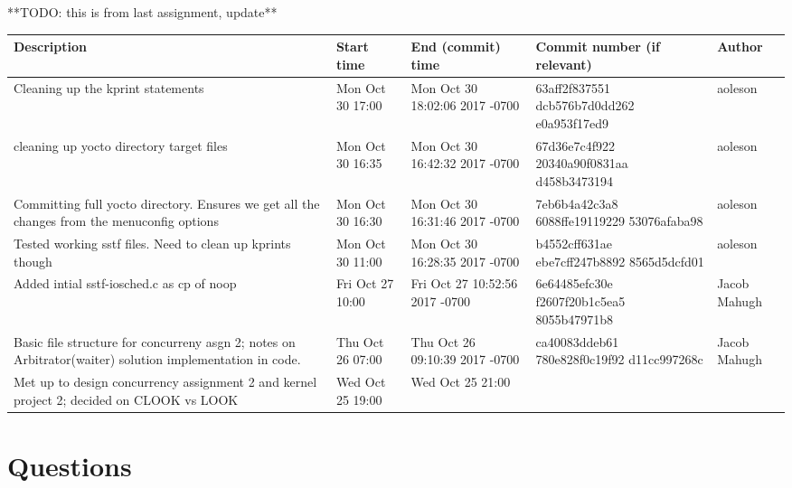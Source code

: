 \documentclass[letterpaper,10pt,titlepage]{article}
\begin{document}
**TODO: this is from last assignment, update**


\begin{table}[H]
\centering
\begin{tabular}{|p{3cm}|p{2cm}|p{2cm}|p{3cm}|p{2cm}|}
\hline
Description                                                                                              & Start time       & End (commit) time              & Commit number (if relevant)              & Author       \\
\hline
Cleaning up the kprint statements                                                                        & Mon Oct 30 17:00 & Mon Oct 30 18:02:06 2017 -0700 & 63aff2f837551 dcb576b7d0dd262 e0a953f17ed9 & aoleson      \\
\hline
cleaning up yocto directory target files                                                                 & Mon Oct 30 16:35 & Mon Oct 30 16:42:32 2017 -0700 & 67d36e7c4f922 20340a90f0831aa d458b3473194 & aoleson      \\
\hline
Committing full yocto directory. Ensures we get all the changes from the menuconfig options              & Mon Oct 30 16:30 & Mon Oct 30 16:31:46 2017 -0700 & 7eb6b4a42c3a8 6088ffe19119229 53076afaba98 & aoleson      \\
\hline
Tested working sstf files. Need to clean up kprints though                                               & Mon Oct 30 11:00 & Mon Oct 30 16:28:35 2017 -0700 & b4552cff631ae ebe7cff247b8892 8565d5dcfd01 & aoleson      \\
\hline
Added intial sstf-iosched.c as cp of noop                                                                & Fri Oct 27 10:00 & Fri Oct 27 10:52:56 2017 -0700 & 6e64485efc30e f2607f20b1c5ea5 8055b47971b8 & Jacob Mahugh \\
\hline
Basic file structure for concurreny asgn 2; notes on Arbitrator(waiter) solution implementation in code. & Thu Oct 26 07:00 & Thu Oct 26 09:10:39 2017 -0700 & ca40083ddeb61 780e828f0c19f92 d11cc997268c & Jacob Mahugh \\
\hline
Met up to design concurrency assignment 2 and kernel project 2; decided on CLOOK vs LOOK                 & Wed Oct 25 19:00 & Wed Oct 25 21:00               &                                          &             	 \\
\hline
\end{tabular}
\end{table}

\section{Questions}
\end{document}
